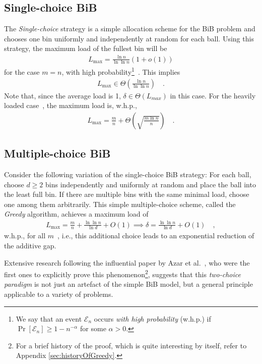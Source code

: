 \documentclass[a4paper,12pt]{article}
\newcommand\load{L_{\mathrm{max}}}
\begin{document}
\subsection{Single-choice BiB}
\label{sec:single-choice}
The \emph{Single-choice} strategy is a simple allocation scheme for the BiB problem and chooses one bin uniformly and independently at random for each ball. Using this strategy, the maximum load of the fullest bin will be
\begin{align*}
\load = \frac{\ln n}{\ln \ln n}  \left(1 + o\left(1\right)\right)
\end{align*}
for the case $m=n$, with high probability\footnote{We say that an event $\mathcal E_n$ occurs \emph{with high probability} (w.h.p.) if $\Pr\left[\mathcal E_n \right] \geq 1 - n^{-\alpha}$ for some $\alpha > 0$.}~\cite{RS98}. This implies
\begin{align*}
\load\in \Theta\left(\frac{\ln n}{\ln \ln n}\right)\quad .
\end{align*}
Note that, since the average load is 1, $\delta \in \Theta\left( L_{max} \right)$ in this case. For the heavily loaded case~\cite{RS98}, the maximum load is, w.h.p.,
\begin{align*}
\load = \frac{m}{n} + \Theta\left(\sqrt{\frac{m  \ln n}{n}}\right)\quad .
\end{align*}

\subsection{Multiple-choice BiB}
Consider the following variation of the  single-choice BiB strategy: For each ball, choose $d \geq 2$ bins independently and uniformly at random and place the ball into the least full bin. If there are multiple bins with the same minimal load, choose one among them arbitrarily. This simple multiple-choice scheme, called the \emph{Greedy} algorithm, achieves a maximum load of
\begin{align*}
\load = \frac{m}{n}+\frac{\ln \ln n}{\ln d} + O(1) \implies \delta = \frac{\ln \ln n}{\ln d} + O(1) \quad ,
\end{align*}
w.h.p., for all $m$~\cite{ABKU99, BCSV06}, i.e., this additional choice leads to an exponential reduction of the additive gap. 
\begin{comment}
Curiously, the exponential decrease in the gap is already achieved having just two choices (that is, $d=2$). Each additional choice decreases the bound for the maximum gap by just a constant factor~\cite{MRS01}. 
\end{comment}
Extensive research following the influential paper by Azar et al.~\cite{ABKU99}, who were the first ones to explicitly prove this phenomenon\footnote{For a brief history of the proof, which is quite interesting by itself, refer to Appendix \ref{sec:historyOfGreedy}.}, suggests that this \emph{two-choice paradigm} is not just an artefact of the simple BiB model, but a general principle applicable to a variety of problems. 
\end{document}
